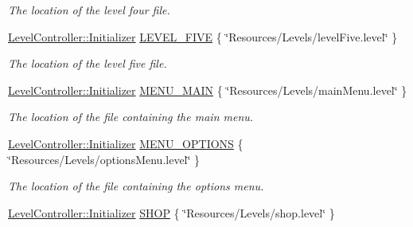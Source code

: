 \begin{DoxyCompactItemize}
\begin{DoxyCompactList}\small\item\em The location of the level four file. \end{DoxyCompactList}\item 
\hypertarget{class_level_controller_a634c5a8bde652242d217999ddc743e6d}{\hyperlink{class_level_controller_1_1_initializer}{Level\+Controller\+::\+Initializer} \hyperlink{class_level_controller_a634c5a8bde652242d217999ddc743e6d}{L\+E\+V\+E\+L\+\_\+\+F\+I\+V\+E} \{ \char`\"{}Resources/Levels/level\+Five.\+level\char`\"{} \}}\label{class_level_controller_a634c5a8bde652242d217999ddc743e6d}

\begin{DoxyCompactList}\small\item\em The location of the level five file. \end{DoxyCompactList}\item 
\hypertarget{class_level_controller_ad4835322127c6b5d093be8f8ea1735bd}{\hyperlink{class_level_controller_1_1_initializer}{Level\+Controller\+::\+Initializer} \hyperlink{class_level_controller_ad4835322127c6b5d093be8f8ea1735bd}{M\+E\+N\+U\+\_\+\+M\+A\+I\+N} \{ \char`\"{}Resources/Levels/main\+Menu.\+level\char`\"{} \}}\label{class_level_controller_ad4835322127c6b5d093be8f8ea1735bd}

\begin{DoxyCompactList}\small\item\em The location of the file containing the main menu. \end{DoxyCompactList}\item 
\hypertarget{class_level_controller_a062b3091693fbfeb9140431659899ad7}{\hyperlink{class_level_controller_1_1_initializer}{Level\+Controller\+::\+Initializer} \hyperlink{class_level_controller_a062b3091693fbfeb9140431659899ad7}{M\+E\+N\+U\+\_\+\+O\+P\+T\+I\+O\+N\+S} \{ \char`\"{}Resources/Levels/options\+Menu.\+level\char`\"{} \}}\label{class_level_controller_a062b3091693fbfeb9140431659899ad7}

\begin{DoxyCompactList}\small\item\em The location of the file containing the options menu. \end{DoxyCompactList}\item 
\hypertarget{class_level_controller_a3cc829ed89f8a4fad54369bcdb10e985}{\hyperlink{class_level_controller_1_1_initializer}{Level\+Controller\+::\+Initializer} \hyperlink{class_level_controller_a3cc829ed89f8a4fad54369bcdb10e985}{S\+H\+O\+P} \{ \char`\"{}Resources/Levels/shop.\+level\char`\"{} \}}\label{class_level_controller_a3cc829ed89f8a4fad54369bcdb10e985}


\end{DoxyCompactItemize}
